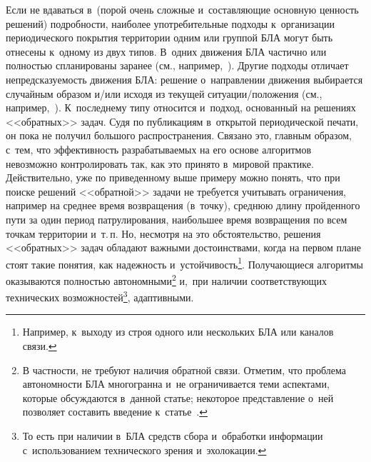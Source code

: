 \begin{multicols}{2}
Если не вдаваться в~(порой очень сложные 
и~со\-став\-ля\-ющие основную цен\-ность решений) подробности, наиболее 
упо\-тре\-би\-тель\-ные подходы к~организации периодического покрытия 
территории \mbox{одним} или группой БЛА могут быть отнесены к~одному из двух 
типов. В~одних движения БЛА час\-тич\-но или пол\-ностью спланированы 
заранее (см., например,~\cite{3-kraz, 20-kraz}). Другие подходы отличает 
не\-пред\-ска\-зу\-емость движения БЛА: решение о~на\-прав\-ле\-нии движения 
выбирается случайным образом и/или исходя из текущей  
си\-ту\-а\-ции/по\-ло\-же\-ния (см., например,~\cite{21-kraz, 22-kraz, 23-kraz}). 
К~по\-след\-не\-му типу относится и~подход, основанный на решениях 
<<обратных>> задач. Судя по пуб\-ли\-ка\-ци\-ям в~открытой периодической 
печати, он пока не получил большого распространения. Связано это, главным 
образом, с~тем, что эф\-фек\-тив\-ность раз\-ра\-ба\-ты\-ва\-емых на его основе 
алгоритмов невозможно контролировать так, как это принято в~мировой 
практике. 
%
Действительно, уже по приведенному выше примеру мож\-но 
понять, что при поиске решений <<обратной>> задачи не требуется 
учитывать ограничения, например на среднее время воз\-вра\-ще\-ния (в~точ\-ку), 
сред\-нюю длину пройденного пути за один период патрулирования, 
наибольшее время воз\-вра\-ще\-ния по всем точ\-кам территории и~т.\,п. Но, 
несмотря на это обстоятельство, решения <<обрат\-ных>> задач обладают 
важными достоинствами, когда на первом плане стоят такие понятия, как 
на\-деж\-ность и~устой\-чи\-вость\footnote{Например, к~выходу из строя одного или 
нескольких БЛА или каналов связи.}. По\-лу\-ча\-ющи\-еся алгоритмы оказываются 
пол\-ностью автономными\footnote{В частности, не требуют наличия обратной связи. 
Отметим, что проблема автономности БЛА многогранна и~не ограничивается теми аспектами, 
которые обсуждаются в~данной \mbox{статье}; некоторое представление 
о~ней позволяет составить введение к~\mbox{статье}~\cite{27-kraz}.} и,~при наличии со\-от\-вет\-ст\-ву\-ющих технических 
возможностей\footnote{То есть при наличии в~БЛА средств сбора и~обработки информации 
с~использованием технического зрения и~эхолокации.}, адап\-тив\-ными. 
  

\end{multicols}
